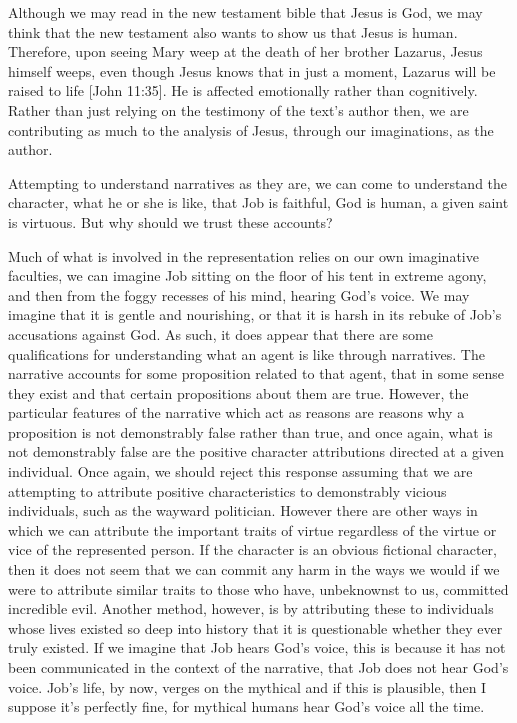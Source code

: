 \documentclass[
  12pt,
]{book}
\theoremstyle{definition}
\theoremstyle{definition}
\theoremstyle{definition}
\theoremstyle{definition}
\theoremstyle{remark}
\begin{document}
Although we may read in the new testament bible that Jesus is God, we may think that the new testament also wants to show us that Jesus is human. Therefore, upon seeing Mary weep at the death of her brother Lazarus, Jesus himself weeps, even though Jesus knows that in just a moment, Lazarus will be raised to life {[}John 11:35{]}. He is affected emotionally rather than cognitively. Rather than just relying on the testimony of the text's author then, we are contributing as much to the analysis of Jesus, through our imaginations, as the author.

Attempting to understand narratives as they are, we can come to understand the character, what he or she is like, that Job is faithful, God is human, a given saint is virtuous. But why should we trust these accounts?

Much of what is involved in the representation relies on our own imaginative faculties, we can imagine Job sitting on the floor of his tent in extreme agony, and then from the foggy recesses of his mind, hearing God's voice. We may imagine that it is gentle and nourishing, or that it is harsh in its rebuke of Job's accusations against God. As such, it does appear that there are some qualifications for understanding what an agent is like through narratives. The narrative accounts for some proposition related to that agent, that in some sense they exist and that certain propositions about them are true. However, the particular features of the narrative which act as reasons are reasons why a proposition is not demonstrably false rather than true, and once again, what is not demonstrably false are the positive character attributions directed at a given individual. Once again, we should reject this response assuming that we are attempting to attribute positive characteristics to demonstrably vicious individuals, such as the wayward politician. However there are other ways in which we can attribute the important traits of virtue regardless of the virtue or vice of the represented person. If the character is an obvious fictional character, then it does not seem that we can commit any harm in the ways we would if we were to attribute similar traits to those who have, unbeknownst to us, committed incredible evil. Another method, however, is by attributing these to individuals whose lives existed so deep into history that it is questionable whether they ever truly existed. If we imagine that Job hears God's voice, this is because it has not been communicated in the context of the narrative, that Job does not hear God's voice. Job's life, by now, verges on the mythical and if this is plausible, then I suppose it's perfectly fine, for mythical humans hear God's voice all the time.
\end{document}

